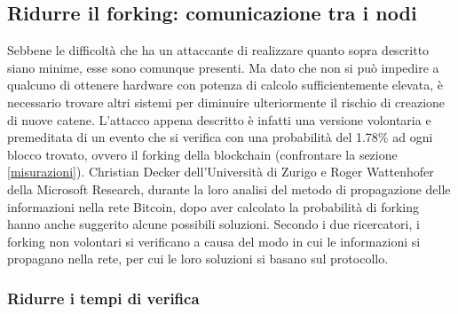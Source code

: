 \subsection{Ridurre il forking: comunicazione tra i nodi}

Sebbene le difficoltà che ha un attaccante di realizzare quanto sopra descritto siano minime, esse sono comunque presenti. Ma dato che non si può impedire a qualcuno di ottenere hardware con potenza di calcolo sufficientemente elevata, è necessario trovare altri sistemi per diminuire ulteriormente il rischio di creazione di nuove catene.
L'attacco appena descritto è infatti una versione volontaria e premeditata di un evento che si verifica con una probabilità del 1.78\% ad ogni blocco trovato, ovvero il forking della blockchain (confrontare la sezione \ref{misurazioni}). Christian Decker dell'Università di Zurigo e Roger Wattenhofer della Microsoft Research, durante la loro analisi del metodo di propagazione delle informazioni nella rete Bitcoin, dopo aver calcolato la probabilità di forking hanno anche suggerito alcune possibili soluzioni.
Secondo i due ricercatori, i forking non volontari si verificano a causa del modo in cui le informazioni si propagano nella rete, per cui le loro soluzioni si basano sul protocollo.

\subsubsection{Ridurre i tempi di verifica}

